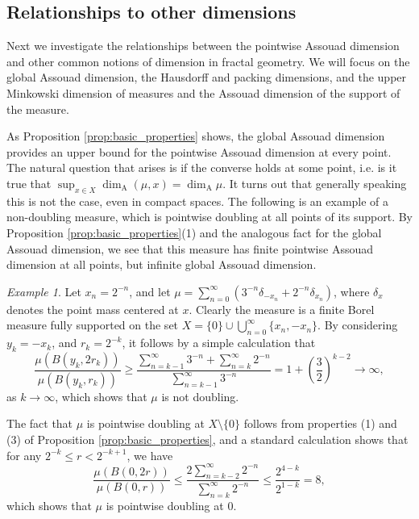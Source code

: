 \documentclass{PRM}
\newcommand{\adim}{\dim_{\mathrm{A}}}
\theoremstyle{plain}
\theoremstyle{definition}
\theoremstyle{remark}
\newtheorem{example}[thm]{Example}
\begin{document}
\subsection{Relationships to other dimensions}

Next we investigate the relationships between the pointwise Assouad dimension and other common notions of dimension in fractal geometry. We will focus on the global Assouad dimension, the Hausdorff and packing dimensions, and the upper Minkowski dimension of measures and the Assouad dimension of the support of the measure.

As Proposition \ref{prop:basic_properties} shows, the global Assouad dimension provides an upper bound for the pointwise Assouad dimension at every point. The natural question that arises is if the converse holds at some point, i.e. is it true that $\sup_{x\in X}\adim(\mu,x)=\adim\mu$. It turns out that generally speaking this is not the case, even in compact spaces. The following is an example of a non-doubling measure, which is pointwise doubling at all points of its support. By Proposition \ref{prop:basic_properties}(1) and the analogous fact for the global Assouad dimension, we see that this measure has finite pointwise Assouad dimension at all points, but infinite global Assouad dimension.

\begin{example}\label{ex:loc_not_glob_doubling}
    Let $x_n=2^{-n}$, and let $\mu=\sum_{n=0}^{\infty}(3^{-n}\delta_{-x_n}+2^{-n}\delta_{x_n})$, where $\delta_x$ denotes the point mass centered at $x$. Clearly the measure is a finite Borel measure fully supported on the set $X=\{0\}\cup\bigcup_{n=0}^{\infty}\{x_n,-x_n\}$. By considering $y_k=-x_k$, and $r_k=2^{-k}$, it follows by a simple calculation that
    \begin{equation*}
        \frac{\mu(B(y_k,2r_k))}{\mu(B(y_k,r_k))}\geq\frac{\sum_{n=k-1}^{\infty}3^{-n}+\sum_{n=k}^{\infty}2^{-n}}{\sum_{n=k-1}^{\infty}3^{-n}}=1+\left(\frac{3}{2}\right)^{k-2} \to \infty,
    \end{equation*}
    as $k\to\infty$, which shows that $\mu$ is not doubling.
    
    The fact that $\mu$ is pointwise doubling at $X\setminus\{0\}$ follows from properties (1) and (3) of Proposition \ref{prop:basic_properties}, and a standard calculation shows that for any  $2^{-k}\leq r < 2^{-k+1}$, we have
    \begin{equation*}
        \frac{\mu(B(0,2r))}{\mu(B(0,r))}\leq \frac{2\sum_{n=k-2}^{\infty}2^{-n}}{\sum_{n=k}^{\infty}2^{-n}}\leq\frac{2^{4-k}}{2^{1-k}}=8,
    \end{equation*}
    which shows that $\mu$ is pointwise doubling at $0$.
\end{example}
\end{document}
